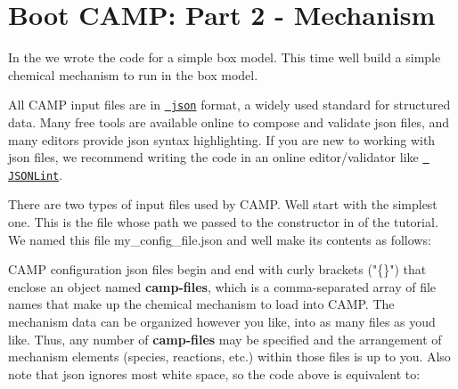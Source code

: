 \chapter{Boot CAMP\+: Part 2 -\/ Mechanism}
\hypertarget{camp_tutorial_part_2}{}\label{camp_tutorial_part_2}
In the  we wrote the code for a simple box model. This time we\textquotesingle{}ll build a simple chemical mechanism to run in the box model.

All CAMP input files are in \href{http://json.org}{\texttt{ json}} format, a widely used standard for structured data. Many free tools are available online to compose and validate {\ttfamily json} files, and many editors provide {\ttfamily json} syntax highlighting. If you are new to working with {\ttfamily json} files, we recommend writing the code in an online editor/validator like \href{https://jsonlint.com}{\texttt{ JSONLint}}.

There are two types of input files used by CAMP. We\textquotesingle{}ll start with the simplest one. This is the file whose path we passed to the  constructor in  of the tutorial. We named this file {\ttfamily my\+\_\+config\+\_\+file.\+json} and we\textquotesingle{}ll make its contents as follows\+: 
\begin{DoxyCode}{0}
\DoxyCodeLine{\{}
\DoxyCodeLine{\ \ \ :\ [}
\DoxyCodeLine{\ \ \ \ }
\DoxyCodeLine{\ \ ]}
\DoxyCodeLine{\}}

\end{DoxyCode}
 CAMP configuration {\ttfamily json} files begin and end with curly brackets ("{}\{\}"{}) that enclose an object named {\bfseries{camp-\/files}}, which is a comma-\/separated array of file names that make up the chemical mechanism to load into CAMP. The mechanism data can be organized however you like, into as many files as you\textquotesingle{}d like. Thus, any number of {\bfseries{camp-\/files}} may be specified and the arrangement of mechanism elements (species, reactions, etc.) within those files is up to you. Also note that {\ttfamily json} ignores most white space, so the code above is equivalent to\+: 
\begin{DoxyCode}{0}
\DoxyCodeLine{\{\ \ :\ \ \ \ \ [\ \ ]\ \ \ \}}

\end{DoxyCode}


